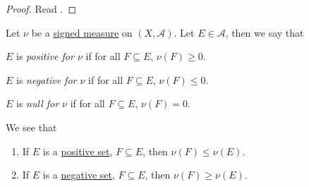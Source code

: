 \begin{proof}
	Read \cite{folland1999real}.
\end{proof}
\begin{definition*}
	Let \(\nu\) be a \hyperref[def:signed-measure]{signed measure} on \((X, \mathcal{A})\). Let \(E \in \mathcal{A}\), then we say that
	\begin{definition}\label{def:positive-set-for-a-signed-measure}
		\(E\) is \emph{positive for \(\nu\)} if for all \(F \subseteq E\), \(\nu(F) \geq 0\).
	\end{definition}
	\begin{definition}\label{def:negative-set-for-a-signed-measure}
		\(E\) is \emph{negative for \(\nu\)} if for all \(F \subseteq E\), \(\nu(F) \leq 0\).
	\end{definition}
	\begin{definition}\label{def:null-set-for-a-signed-measure}
		\(E\) is \emph{null for \(\nu\)} if for all \(F \subseteq E\), \(\nu(F) = 0\).
	\end{definition}
\end{definition*}

\begin{note}
	We see that
	\begin{enumerate}[(1)]
		\item If \(E\) is a \hyperref[def:positive-set-for-a-signed-measure]{positive set}, \(F \subseteq E\), then \(\nu(F) \leq \nu(E)\).
		\item If \(E\) is a \hyperref[def:negative-set-for-a-signed-measure]{negative set}, \(F \subseteq E\), then \(\nu(F) \geq \nu(E)\).
	\end{enumerate}
\end{note}

